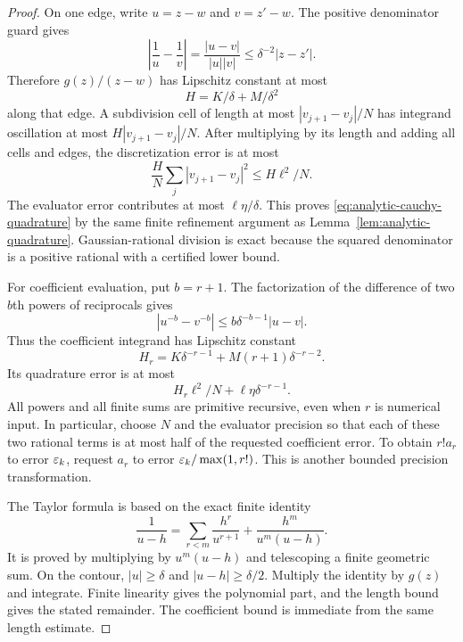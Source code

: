 \begin{proof}
On one edge, write $u=z-w$ and $v=z'-w$.  The positive denominator guard gives
\[
 \left|\frac1u-\frac1v\right|
 =\frac{|u-v|}{|u||v|}\le\delta^{-2}|z-z'|.
\]
Therefore $g(z)/(z-w)$ has Lipschitz constant at most
\[
 H=K/\delta+M/\delta^2
\]
along that edge.  A subdivision cell of length at most $|v_{j+1}-v_j|/N$ has integrand oscillation at most $H|v_{j+1}-v_j|/N$.  After multiplying by its length and adding all cells and edges, the discretization error is at most
\[
 \frac HN\sum_j|v_{j+1}-v_j|^2\le H\ell^2/N.
\]
The evaluator error contributes at most $\ell\eta/\delta$.  This proves \eqref{eq:analytic-cauchy-quadrature} by the same finite refinement argument as Lemma~\ref{lem:analytic-quadrature}.  Gaussian-rational division is exact because the squared denominator is a positive rational with a certified lower bound.

For coefficient evaluation, put $b=r+1$.  The factorization of the difference of two $b$th powers of reciprocals gives
\[
 |u^{-b}-v^{-b}|\le b\delta^{-b-1}|u-v|.
\]
Thus the coefficient integrand has Lipschitz constant
\[
 H_r=K\delta^{-r-1}+M(r+1)\delta^{-r-2}.
\]
Its quadrature error is at most
\[
 H_r\ell^2/N+\ell\eta\delta^{-r-1}.
\]
All powers and all finite sums are primitive recursive, even when $r$ is numerical input.  In particular, choose $N$ and the evaluator precision so that each of these two rational terms is at most half of the requested coefficient error.  To obtain $r!a_r$ to error $\varepsilon_k$, request $a_r$ to error $\varepsilon_k/\max(1,r!)$.  This is another bounded precision transformation.

The Taylor formula is based on the exact finite identity
\begin{equation}
 \frac1{u-h}=\sum_{r<m}\frac{h^r}{u^{r+1}}+
             \frac{h^m}{u^m(u-h)}.\label{eq:analytic-geometric-identity}
\end{equation}
It is proved by multiplying by $u^m(u-h)$ and telescoping a finite geometric sum.  On the contour, $|u|\ge\delta$ and $|u-h|\ge\delta/2$.  Multiply the identity by $g(z)$ and integrate.  Finite linearity gives the polynomial part, and the length bound gives the stated remainder.  The coefficient bound is immediate from the same length estimate.


\end{proof}
